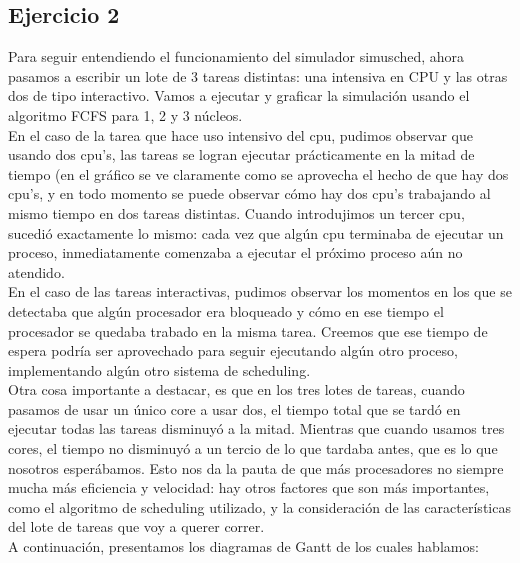 \documentclass[a4paper]{article}
\begin{document}
\subsection{Ejercicio 2}
Para seguir entendiendo el funcionamiento del simulador simusched, ahora pasamos a escribir un lote
de 3 tareas distintas: una intensiva en CPU y las otras dos de tipo interactivo. Vamos a ejecutar y
graficar la simulaci\'on usando el algoritmo FCFS para 1, 2 y 3 n\'ucleos. \\
En el caso de la tarea que hace uso intensivo del cpu, pudimos observar que usando dos cpu's, las
tareas se logran ejecutar pr\'acticamente en la mitad de tiempo (en el gr\'afico se ve claramente como
se aprovecha el hecho de que hay dos cpu's, y en todo momento se puede observar c\'omo hay dos cpu's 
trabajando al mismo tiempo en dos tareas distintas. Cuando introdujimos un tercer cpu, sucedi\'o 
exactamente lo mismo: cada vez que alg\'un cpu terminaba de ejecutar un proceso, inmediatamente
comenzaba a ejecutar el pr\'oximo proceso a\'un no atendido. \\
En el caso de las tareas interactivas, pudimos observar los momentos en los que se detectaba que 
alg\'un procesador era bloqueado y c\'omo en ese tiempo el procesador se quedaba trabado en la misma 
tarea. Creemos que ese tiempo de espera podr\'ia ser aprovechado para seguir ejecutando alg\'un otro
proceso, implementando alg\'un otro sistema de scheduling. \\
Otra cosa importante a destacar, es que en los tres lotes de tareas, cuando pasamos de usar un \'unico
core a usar dos, el tiempo total que se tard\'o en ejecutar todas las tareas disminuy\'o a la mitad.
Mientras que cuando usamos tres cores, el tiempo no disminuy\'o a un tercio de lo que tardaba antes,
que es lo que nosotros esper\'abamos. Esto nos da la pauta de que m\'as procesadores no siempre
mucha m\'as eficiencia y velocidad: hay otros factores que son m\'as importantes, como el algoritmo de
scheduling utilizado, y la consideraci\'on de las caracter\'isticas del lote de tareas que voy a querer
correr. \\
A continuaci\'on, presentamos los diagramas de Gantt de los cuales hablamos: \\
\end{document}
